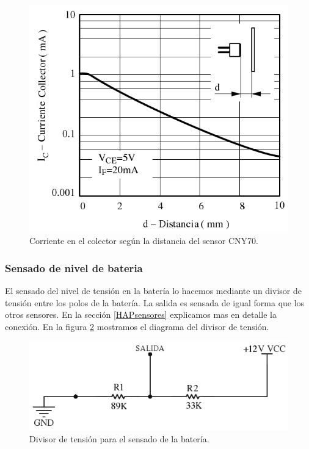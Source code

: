 \begin{figure}[ht]
	\centering
	\includegraphics[scale=0.35]{piso-IxD.png}
	\caption{Corriente en el colector seg\'un la distancia del sensor CNY70.}
	\label{HFpisoID}
\end{figure}

\subsubsection{Sensado de nivel de bateria}
\label{HSnivelBateria}

El sensado del nivel de tensi\'on en la bater\'ia lo hacemos mediante un divisor de tensi\'on entre los polos de la bater\'ia.
La salida es sensada de igual forma que los otros sensores. En la secci\'on \ref{HAPsensores} explicamos mas en detalle la conexi\'on.
En la figura \ref{HFbateria} mostramos el diagrama del divisor de tensi\'on.

\begin{figure}[ht]
	\centering
	\includegraphics[scale=0.35]{bateria.png}
	\caption{Divisor de tensi\'on para el sensado de la bater\'ia.}
	\label{HFbateria}
\end{figure}

